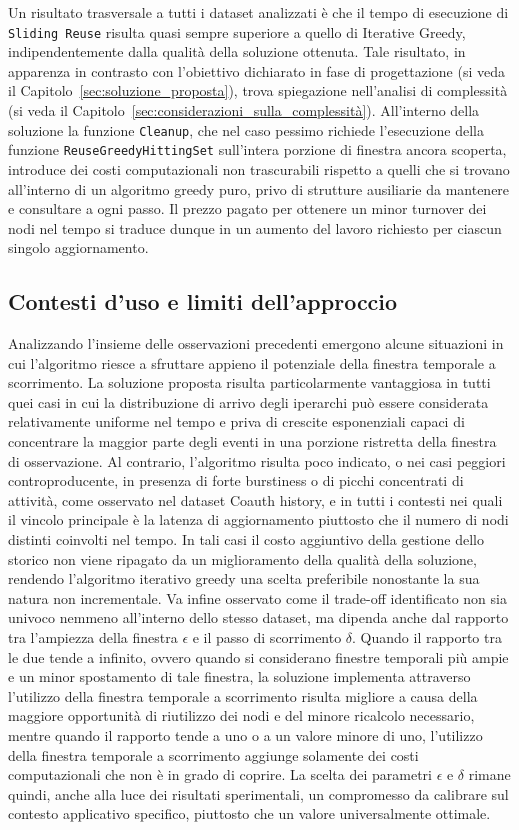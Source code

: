 Un risultato trasversale a tutti i dataset analizzati è che il tempo di esecuzione di \texttt{Sliding Reuse} risulta quasi sempre superiore a quello di Iterative Greedy, indipendentemente dalla qualità della soluzione ottenuta.
Tale risultato, in apparenza in contrasto con l'obiettivo dichiarato in fase di progettazione (si veda il Capitolo~\ref{sec:soluzione_proposta}), trova spiegazione nell'analisi di complessità (si veda il  Capitolo~\ref{sec:considerazioni_sulla_complessità}).
All'interno della soluzione la funzione \texttt{Cleanup}, che nel caso pessimo richiede l'esecuzione della funzione \texttt{ReuseGreedyHittingSet} sull'intera porzione di finestra ancora scoperta, introduce dei costi computazionali non trascurabili rispetto a quelli che si trovano all'interno di un algoritmo greedy puro, privo di strutture ausiliarie da mantenere e consultare a ogni passo.
Il prezzo pagato per ottenere un minor turnover dei nodi nel tempo si traduce dunque in un aumento del lavoro richiesto per ciascun singolo aggiornamento.

\subsection*{Contesti d'uso e limiti dell'approccio}

Analizzando l'insieme delle osservazioni precedenti emergono alcune situazioni in cui l'algoritmo riesce a sfruttare appieno il potenziale della finestra temporale a scorrimento.
La soluzione proposta risulta particolarmente vantaggiosa in tutti quei casi in cui la distribuzione di arrivo degli iperarchi può essere considerata relativamente uniforme nel tempo e priva di crescite esponenziali capaci di concentrare la maggior parte degli eventi in una porzione ristretta della finestra di osservazione.
Al contrario, l'algoritmo risulta poco indicato, o nei casi peggiori controproducente, in presenza di forte burstiness o di picchi concentrati di attività, come osservato nel dataset Coauth history, e in tutti i contesti nei quali il vincolo principale è la latenza di aggiornamento piuttosto che il numero di nodi distinti coinvolti nel tempo.
In tali casi il costo aggiuntivo della gestione dello storico non viene ripagato da un miglioramento della qualità della soluzione, rendendo l'algoritmo iterativo greedy una scelta preferibile nonostante la sua natura non incrementale.
Va infine osservato come il trade-off identificato non sia univoco nemmeno all'interno dello stesso dataset, ma dipenda anche dal rapporto tra l'ampiezza della finestra $\epsilon$ e il passo di scorrimento $\delta$.
Quando il rapporto tra le due tende a infinito, ovvero quando si considerano finestre temporali più ampie e un minor spostamento di tale finestra, la soluzione implementa attraverso l'utilizzo della finestra temporale a scorrimento risulta migliore a causa della maggiore opportunità di riutilizzo dei nodi e del minore ricalcolo necessario, mentre quando il rapporto tende a uno o a un valore minore di uno, l'utilizzo della finestra temporale a scorrimento aggiunge solamente dei costi computazionali che non è in grado di coprire.
La scelta dei parametri $\epsilon$ e $\delta$ rimane quindi, anche alla luce dei risultati sperimentali, un compromesso da calibrare sul contesto applicativo specifico, piuttosto che un valore universalmente ottimale.